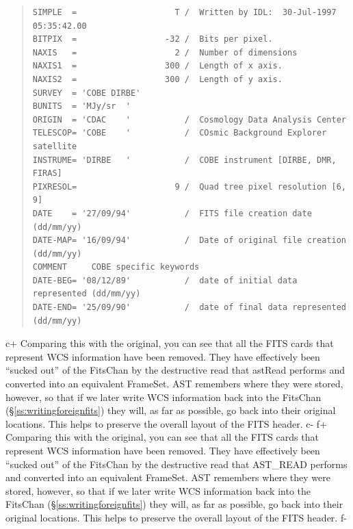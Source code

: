 \documentclass[twoside,11pt]{article}
\newcommand{\secref}[1]{\S\ref{#1}}
\newcommand{\secref}[1]{\ref{#1}}
\begin{document}
\begin{quote}
\small
\begin{verbatim}
SIMPLE  =                    T /  Written by IDL:  30-Jul-1997 05:35:42.00      
BITPIX  =                  -32 /  Bits per pixel.                               
NAXIS   =                    2 /  Number of dimensions                          
NAXIS1  =                  300 /  Length of x axis.                             
NAXIS2  =                  300 /  Length of y axis.                             
SURVEY  = 'COBE DIRBE'                                                          
BUNITS  = 'MJy/sr  '                                                            
ORIGIN  = 'CDAC    '           /  Cosmology Data Analysis Center                
TELESCOP= 'COBE    '           /  COsmic Background Explorer satellite          
INSTRUME= 'DIRBE   '           /  COBE instrument [DIRBE, DMR, FIRAS]           
PIXRESOL=                    9 /  Quad tree pixel resolution [6, 9]             
DATE    = '27/09/94'           /  FITS file creation date (dd/mm/yy)            
DATE-MAP= '16/09/94'           /  Date of original file creation (dd/mm/yy)     
COMMENT     COBE specific keywords                                              
DATE-BEG= '08/12/89'           /  date of initial data represented (dd/mm/yy)   
DATE-END= '25/09/90'           /  date of final data represented   (dd/mm/yy)   
\end{verbatim}
\normalsize
\end{quote}

c+
Comparing this with the original, you can see that all the FITS cards
that represent WCS information have been removed. They have
effectively been ``sucked out'' of the FitsChan by the destructive
read that astRead performs and converted into an equivalent
FrameSet. AST remembers where they were stored, however, so that if we
later write WCS information back into the FitsChan
(\secref{ss:writingforeignfits}) they will, as far as possible, go
back into their original locations. This helps to preserve the overall
layout of the FITS header.
c-
f+
Comparing this with the original, you can see that all the FITS cards
that represent WCS information have been removed. They have
effectively been ``sucked out'' of the FitsChan by the destructive
read that AST\_READ performs and converted into an equivalent
FrameSet. AST remembers where they were stored, however, so that if we
later write WCS information back into the FitsChan
(\secref{ss:writingforeignfits}) they will, as far as possible, go
back into their original locations.  This helps to preserve the
overall layout of the FITS header.
f-
\end{document}
